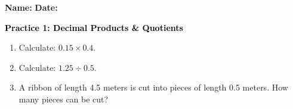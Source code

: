 \documentclass[12pt, letterpaper, fleqn]{article}
\begin{document}
\textbf{Name:} \underline{\hspace{5cm}}
\hfill
\textbf{Date:} \underline{\hspace{3cm}}\\

\begin{tcolorbox}[colback=customteal!20]
    \large\textcolor{black}{\textbf{Practice 1: Decimal Products & Quotients}}
\end{tcolorbox}
\begin{enumerate}[itemsep=3.5cm, leftmargin=0.6cm]
\item Calculate: $0.15 \times 0.4$.
\vspace{3.5cm}
\item Calculate: $1.25 \div 0.5$.
\vspace{3.5cm}
\item A ribbon of length 4.5 meters is cut into pieces of length 0.5 meters. How many pieces can be cut?
\end{enumerate}
\end{document}
